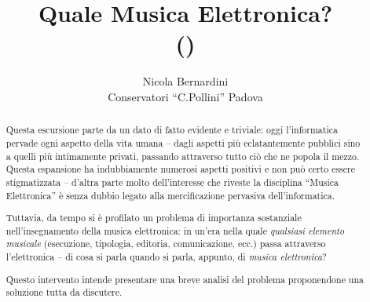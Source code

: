 \documentclass{scrartcl}
\title%
{%
  Quale Musica Elettronica?\\%
  {\tiny (\reltag)}
}
\author%
{%
  Nicola Bernardini\\
  Conservatori ``C.Pollini'' Padova%
}%
\begin{document}
\maketitle

\begin{abstract}
  Questa escursione parte da un dato di fatto evidente e triviale: oggi
  l'informatica pervade ogni aspetto della vita umana -- dagli aspetti pi\`u
  eclatantemente pubblici sino a quelli pi\`u intimamente privati, passando
  attraverso tutto ci\`o che ne popola il mezzo. Questa espansione ha
  indubbiamente numerosi aspetti positivi e non pu\`o certo essere
  stigmatizzata -- d'altra parte molto dell'interesse che riveste la
  disciplina ``Musica Elettronica'' \`e senza dubbio legato alla
  mercificazione pervasiva dell'informatica.

  Tuttavia, da tempo si \`e profilato un problema di importanza sostanziale
  nell'insegnamento della musica elettronica: in un'era nella quale
  \emph{qualsiasi elemento musicale} (esecuzione, tipologia, editoria,
  comunicazione, ecc.) passa attraverso l'elettronica -- di cosa si parla
  quando si parla, appunto, di \emph{musica elettronica}?

  Questo intervento intende presentare una breve analisi del problema
  proponendone una soluzione tutta da discutere.
\end{abstract}
\end{document}

